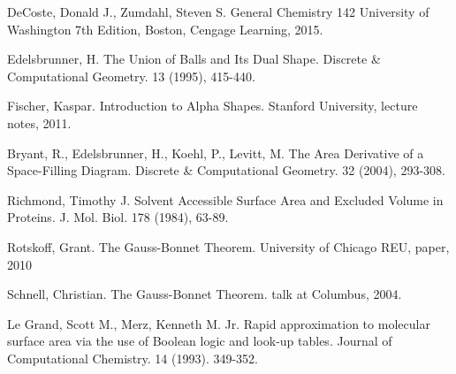 \documentclass{article}
\begin{document}
\listoffigures

\begin{thebibliography}{9}

DeCoste, Donald J., Zumdahl, Steven S. General Chemistry 142 University of Washington 7th Edition, Boston, Cengage Learning, 2015.

Edelsbrunner, H. The Union of Balls and Its Dual Shape. Discrete \& Computational Geometry. 13 (1995), 415-440.

Fischer, Kaspar. Introduction to Alpha Shapes. Stanford University, lecture notes, 2011.

Bryant, R., Edelsbrunner, H., Koehl, P., Levitt, M. The Area Derivative of a Space-Filling Diagram. Discrete \& Computational Geometry. 32 (2004), 293-308.

Richmond, Timothy J. Solvent Accessible Surface Area and Excluded Volume in Proteins. J. Mol. Biol. 178 (1984), 63-89.

Rotskoff, Grant. The Gauss-Bonnet Theorem. University of Chicago REU, paper, 2010

Schnell, Christian. The Gauss-Bonnet Theorem. talk at Columbus, 2004.

Le Grand, Scott M., Merz, Kenneth M. Jr. Rapid approximation to molecular surface area via the use of Boolean logic and look-up tables. Journal of Computational Chemistry. 14 (1993). 349-352.

\end{thebibliography}
\end{document}
